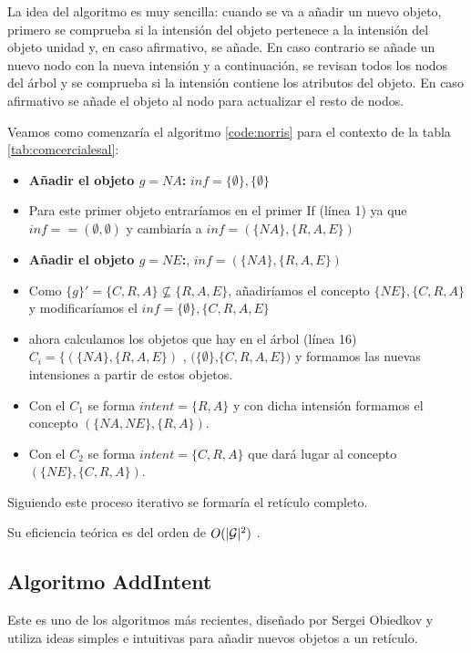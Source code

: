 \documentclass[oneside,openright,titlepage,numbers=noenddot,openany,headinclude,footinclude=true,
cleardoublepage=empty,abstractoff,BCOR=5mm,paper=a4,fontsize=12pt,main=spanish]{scrreprt}
\begin{document}
La idea del algoritmo es muy sencilla: cuando se va a añadir un nuevo objeto, primero se comprueba  si la intensión del objeto pertenece a la intensión del objeto unidad y, en caso afirmativo, se añade. En caso contrario se añade un nuevo nodo con la nueva intensión y a continuación, se revisan todos los nodos del árbol y se comprueba si la intensión contiene los atributos del objeto. En caso afirmativo se añade el objeto al nodo para actualizar el resto de nodos.

Veamos como comenzaría el algoritmo \ref{code:norris} para el contexto de la tabla \ref{tab:comcercialesal}:

\begin{itemize}
    \item \textbf{Añadir el objeto $g=NA$:} $inf=\{\emptyset\},\{\emptyset\}$
    \item[] Para este primer objeto entraríamos en el primer If (línea 1) ya que $inf==(\emptyset,\emptyset)$ y cambiaría a $inf=(\{NA\},\{R,A,E\})$
    \item \textbf{Añadir el objeto $g=NE$:}, $inf=(\{NA\},\{R,A,E\})$
    \item[] Como $\{g\}'=\{C,R,A\} \nsubseteq \{R,A,E\}$, añadiríamos el concepto $\{NE\},\{C,R,A\} $ y modificaríamos el $inf=\{\emptyset\},\{C,R,A,E\}$
    \item[] ahora calculamos los objetos que hay en el árbol (línea 16) $C_i=\{(\{NA\},\{R,A,E\})$ , $(\{\emptyset\}$,$\{C,R,A,E\})$ y formamos las nuevas intensiones a partir de estos objetos.
    \item[] Con el $C_1$ se forma $intent=\{R,A\}$ y con dicha intensión formamos el concepto $(\{NA,NE\},\{R,A\})$.
    \item[] Con el $C_2$ se forma $intent=\{C,R,A\}$ que dará lugar al concepto $(\{NE\},\{C,R,A\})$.
\end{itemize}
Siguiendo este proceso iterativo se formaría el retículo completo.

Su eficiencia teórica es del orden de $O(|\mathcal{G}|^2)$ \cite{godin_incremental_1995}.

\subsection{Algoritmo AddIntent}
\label{alg:addintent}


Este es uno de los algoritmos más recientes, diseñado por Sergei Obiedkov \cite{addintent} y utiliza ideas simples e intuitivas para añadir nuevos objetos a un retículo.
\end{document}
